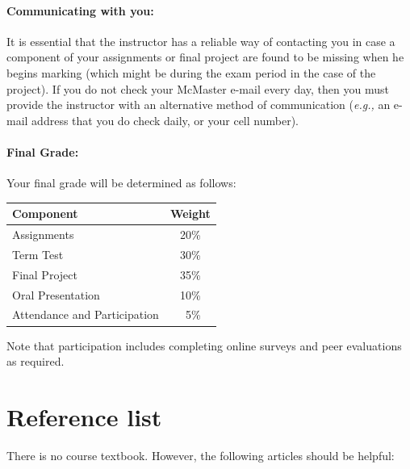 \documentclass[12pt]{article}
\begin{document}
\paragraph*{Communicating with you:}

It is essential that the instructor has a reliable way of contacting you in case a component of your assignments or final project are found to be missing when he begins marking (which might be during the exam period in the case of the project).  If you do not check your McMaster e-mail every day, then you must provide the instructor with an alternative method of communication (\emph{e.g.,} an e-mail address that you do check daily, or your cell number).

\paragraph*{Final Grade:}
Your final grade will be determined as follows:
%
\begin{center}
\begin{tabular}{l|c}
\bf Component & \bf Weight \\\hline
Assignments & 20\% \\
Term Test & 30\% \\
Final Project & 35\% \\
Oral Presentation & 10\% \\
Attendance and Participation & ~5\% \\
\end{tabular}
\end{center}
\noindent Note that participation includes completing online surveys and peer evaluations as required.

\section*{Reference list}
There is no course textbook.  However, the following articles should be helpful:
\end{document}
